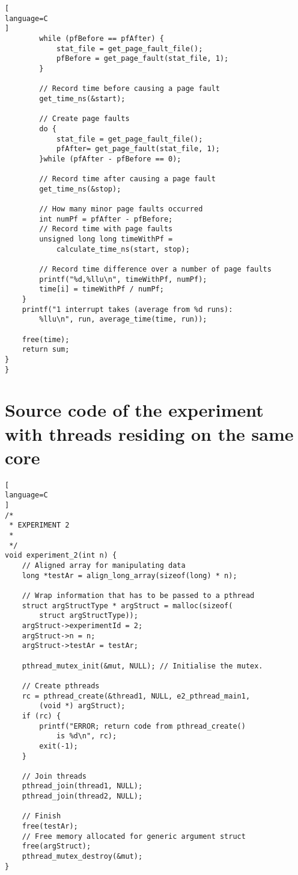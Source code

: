 \begin{appendices}
\begin{lstlisting}[
language=C
]
		while (pfBefore == pfAfter) {
			stat_file = get_page_fault_file();
			pfBefore = get_page_fault(stat_file, 1);
		}
        
        // Record time before causing a page fault
		get_time_ns(&start);

		// Create page faults
		do {
			stat_file = get_page_fault_file();
			pfAfter= get_page_fault(stat_file, 1);
		}while (pfAfter - pfBefore == 0);
    
        // Record time after causing a page fault
		get_time_ns(&stop); 

        // How many minor page faults occurred
		int numPf = pfAfter - pfBefore;
		// Record time with page faults
		unsigned long long timeWithPf =
		    calculate_time_ns(start, stop);
    
        // Record time difference over a number of page faults
		printf("%d,%llu\n", timeWithPf, numPf);
		time[i] = timeWithPf / numPf;
	}
	printf("1 interrupt takes (average from %d runs):
	    %llu\n", run, average_time(time, run));

	free(time);
	return sum;
}
}

\end{lstlisting}


\chapter{Source code of the experiment with threads residing on the same core}
\label{app:listingExperiment2}

\begin{lstlisting}[
language=C
]
/*
 * EXPERIMENT 2
 *
 */
void experiment_2(int n) {
	// Aligned array for manipulating data
	long *testAr = align_long_array(sizeof(long) * n);

	// Wrap information that has to be passed to a pthread
	struct argStructType * argStruct = malloc(sizeof(
	    struct argStructType));
	argStruct->experimentId = 2;
	argStruct->n = n;
	argStruct->testAr = testAr;

	pthread_mutex_init(&mut, NULL); // Initialise the mutex.

	// Create pthreads
	rc = pthread_create(&thread1, NULL, e2_pthread_main1,
	    (void *) argStruct);
	if (rc) {
		printf("ERROR; return code from pthread_create()
		    is %d\n", rc);
		exit(-1);
	}

	// Join threads
	pthread_join(thread1, NULL);
	pthread_join(thread2, NULL);

	// Finish
	free(testAr);
	// Free memory allocated for generic argument struct
	free(argStruct); 
	pthread_mutex_destroy(&mut);
}


\end{lstlisting}
\end{appendices}
